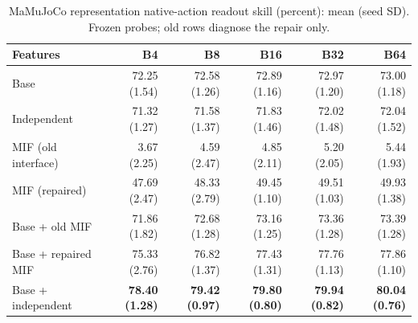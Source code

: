 \begin{table}[!htbp]\centering\small
\setlength{\tabcolsep}{3pt}
\caption{MaMuJoCo representation native-action readout skill (percent): mean (seed SD). Frozen probes; old rows diagnose the repair only.}

\begin{tabular}{lrrrrr}\toprule
Features & B4 & B8 & B16 & B32 & B64 \\\midrule
Base & 72.25 (1.54) & 72.58 (1.26) & 72.89 (1.16) & 72.97 (1.20) & 73.00 (1.18)  \\
Independent & 71.32 (1.27) & 71.58 (1.37) & 71.83 (1.46) & 72.02 (1.48) & 72.04 (1.52)  \\
MIF (old interface) & 3.67 (2.25) & 4.59 (2.47) & 4.85 (2.11) & 5.20 (2.05) & 5.44 (1.93)  \\
MIF (repaired) & 47.69 (2.47) & 48.33 (2.79) & 49.45 (1.10) & 49.51 (1.03) & 49.93 (1.38)  \\
Base + old MIF & 71.86 (1.82) & 72.68 (1.28) & 73.16 (1.25) & 73.36 (1.28) & 73.39 (1.28)  \\
Base + repaired MIF & 75.33 (2.76) & 76.82 (1.37) & 77.43 (1.31) & 77.76 (1.13) & 77.86 (1.10)  \\
Base + independent & \textbf{78.40 (1.28)} & \textbf{79.42 (0.97)} & \textbf{79.80 (0.80)} & \textbf{79.94 (0.82)} & \textbf{80.04 (0.76)} \\
\bottomrule\end{tabular}
\end{table}
